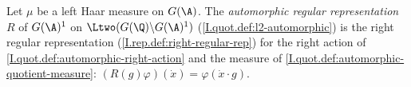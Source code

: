 Let $\mu$ be a left Haar measure on $G(\A)$. The \emph{automorphic regular representation} $R$ of $G(\A)^1$ on
$\Ltwo(G(\Q)\backslash G(\A)^1)$ (\cref{I.quot.def:l2-automorphic}) is the right regular representation
(\cref{I.rep.def:right-regular-rep}) for the right action of \cref{I.quot.def:automorphic-right-action} and the measure of
\cref{I.quot.def:automorphic-quotient-measure}: $(R(g)\varphi)(\dot x)=\varphi(\dot x\cdot g)$.
